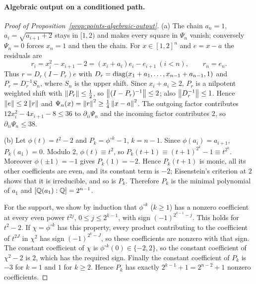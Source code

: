 \paragraph{Algebraic output on a conditioned path.}

\begin{proof}[Proof of Proposition~\ref{prop:points-algebraic-output}]
(a) The chain $a_n=1$, $a_i=\sqrt{a_{i+1}+2}$ stays in $[1,2)$ and makes
every square in $\Psi_n$ vanish; conversely $\Psi_n=0$ forces $x_n=1$ and then the
chain. For $x\in[1,2]^n$ and $e=x-a$ the residuals are
\[
 r_i=x_i^2-x_{i+1}-2=(x_i+a_i)e_i-e_{i+1}\ (i<n),\qquad r_n=e_n .
\]
Thus $r=D_r(I-P_r)e$ with $D_r=\operatorname{diag}(x_1+a_1,\ldots,
x_{n-1}+a_{n-1},1)$ and $P_r=D_r^{-1}S_n$, where $S_n$ is the upper shift.
Since $x_i+a_i\ge2$, $P_r$ is a nilpotent weighted shift with
$\left\lVert P_r\right\rVert\le\frac12$, so $\left\lVert(I-P_r)^{-1}\right\rVert\le2$; also
$\left\lVert D_r^{-1}\right\rVert\le1$. Hence $\left\lVert e\right\rVert\le2\left\lVert r\right\rVert$ and
$\Psi_n(x)=\left\lVert r\right\rVert^2\ge\frac14\left\lVert x-a\right\rVert^2$. The outgoing factor contributes
$12x_i^2-4x_{i+1}-8\le36$ to $\partial_{ii}\Psi_n$ and the incoming factor
contributes $2$, so $\partial_{ii}\Psi_n\le38$.

(b) Let $\phi(t)=t^2-2$ and $P_k=\phi^{\circ k}-1$, $k=n-1$. Since
$\phi(a_i)=a_{i+1}$, $P_k(a_1)=0$. Modulo $2$, $\phi(t)\equiv t^2$, so
$P_k(t+1)\equiv(t+1)^{2^k}-1\equiv t^{2^k}$. Moreover $\phi(\pm1)=-1$ gives
$P_k(1)=-2$. Hence $P_k(t+1)$ is monic, all its other coefficients are even,
and its constant term is $-2$; Eisenstein's criterion at $2$ shows that it
is irreducible, and so is $P_k$. Therefore $P_k$ is the minimal polynomial of
$a_1$ and $[\mathbb Q(a_1):\mathbb Q]=2^{n-1}$.

For the support, we show by induction that $\phi^{\circ k}$ ($k\ge1$) has a
nonzero coefficient at every even power $t^{2j}$, $0\le j\le2^{k-1}$, with
sign $(-1)^{2^{k-1}-j}$. This holds for $t^2-2$. If $\chi=\phi^{\circ k}$
has this property, every product contributing to the coefficient of
$t^{2J}$ in $\chi^2$ has sign $(-1)^{2^k-J}$, so these coefficients are
nonzero with that sign. The constant coefficient of $\chi$ is
$\phi^{\circ k}(0)\in\{-2,2\}$, so the constant coefficient of $\chi^2-2$ is
$2$, which has the required sign. Finally the constant coefficient of $P_k$
is $-3$ for $k=1$ and $1$ for $k\ge2$. Hence $P_k$ has exactly
$2^{k-1}+1=2^{n-2}+1$ nonzero coefficients.


\end{proof}
